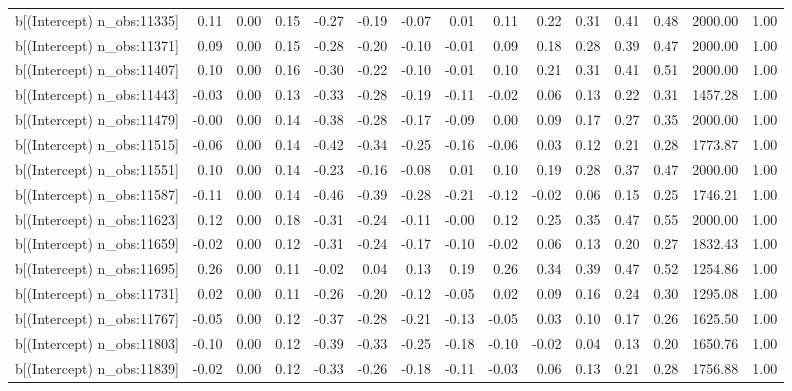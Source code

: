 \begin{table}[ht]
\begin{tabular}{rrrrrrrrrrrrrrr}
  b[(Intercept) n\_obs:11335] & 0.11 & 0.00 & 0.15 & -0.27 & -0.19 & -0.07 & 0.01 & 0.11 & 0.22 & 0.31 & 0.41 & 0.48 & 2000.00 & 1.00 \\ 
  b[(Intercept) n\_obs:11371] & 0.09 & 0.00 & 0.15 & -0.28 & -0.20 & -0.10 & -0.01 & 0.09 & 0.18 & 0.28 & 0.39 & 0.47 & 2000.00 & 1.00 \\ 
  b[(Intercept) n\_obs:11407] & 0.10 & 0.00 & 0.16 & -0.30 & -0.22 & -0.10 & -0.01 & 0.10 & 0.21 & 0.31 & 0.41 & 0.51 & 2000.00 & 1.00 \\ 
  b[(Intercept) n\_obs:11443] & -0.03 & 0.00 & 0.13 & -0.33 & -0.28 & -0.19 & -0.11 & -0.02 & 0.06 & 0.13 & 0.22 & 0.31 & 1457.28 & 1.00 \\ 
  b[(Intercept) n\_obs:11479] & -0.00 & 0.00 & 0.14 & -0.38 & -0.28 & -0.17 & -0.09 & 0.00 & 0.09 & 0.17 & 0.27 & 0.35 & 2000.00 & 1.00 \\ 
  b[(Intercept) n\_obs:11515] & -0.06 & 0.00 & 0.14 & -0.42 & -0.34 & -0.25 & -0.16 & -0.06 & 0.03 & 0.12 & 0.21 & 0.28 & 1773.87 & 1.00 \\ 
  b[(Intercept) n\_obs:11551] & 0.10 & 0.00 & 0.14 & -0.23 & -0.16 & -0.08 & 0.01 & 0.10 & 0.19 & 0.28 & 0.37 & 0.47 & 2000.00 & 1.00 \\ 
  b[(Intercept) n\_obs:11587] & -0.11 & 0.00 & 0.14 & -0.46 & -0.39 & -0.28 & -0.21 & -0.12 & -0.02 & 0.06 & 0.15 & 0.25 & 1746.21 & 1.00 \\ 
  b[(Intercept) n\_obs:11623] & 0.12 & 0.00 & 0.18 & -0.31 & -0.24 & -0.11 & -0.00 & 0.12 & 0.25 & 0.35 & 0.47 & 0.55 & 2000.00 & 1.00 \\ 
  b[(Intercept) n\_obs:11659] & -0.02 & 0.00 & 0.12 & -0.31 & -0.24 & -0.17 & -0.10 & -0.02 & 0.06 & 0.13 & 0.20 & 0.27 & 1832.43 & 1.00 \\ 
  b[(Intercept) n\_obs:11695] & 0.26 & 0.00 & 0.11 & -0.02 & 0.04 & 0.13 & 0.19 & 0.26 & 0.34 & 0.39 & 0.47 & 0.52 & 1254.86 & 1.00 \\ 
  b[(Intercept) n\_obs:11731] & 0.02 & 0.00 & 0.11 & -0.26 & -0.20 & -0.12 & -0.05 & 0.02 & 0.09 & 0.16 & 0.24 & 0.30 & 1295.08 & 1.00 \\ 
  b[(Intercept) n\_obs:11767] & -0.05 & 0.00 & 0.12 & -0.37 & -0.28 & -0.21 & -0.13 & -0.05 & 0.03 & 0.10 & 0.17 & 0.26 & 1625.50 & 1.00 \\ 
  b[(Intercept) n\_obs:11803] & -0.10 & 0.00 & 0.12 & -0.39 & -0.33 & -0.25 & -0.18 & -0.10 & -0.02 & 0.04 & 0.13 & 0.20 & 1650.76 & 1.00 \\ 
  b[(Intercept) n\_obs:11839] & -0.02 & 0.00 & 0.12 & -0.33 & -0.26 & -0.18 & -0.11 & -0.03 & 0.06 & 0.13 & 0.21 & 0.28 & 1756.88 & 1.00 \\ 

\end{tabular}
\end{table}
